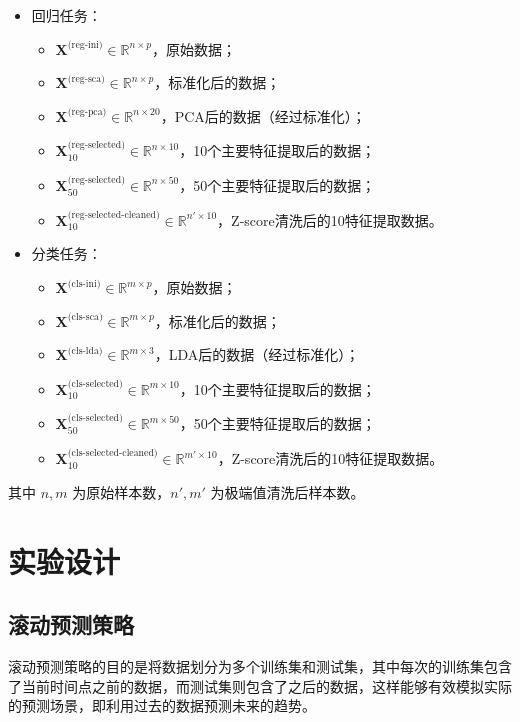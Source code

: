 \documentclass[10pt]{article}
\begin{document}
\begin{itemize}
  \item 回归任务：
    \begin{itemize}
      \item $\mathbf{X}^{\text{(reg-ini)}} \in \mathbb{R}^{n \times p}$，原始数据；
      \item $\mathbf{X}^{\text{(reg-sca)}} \in \mathbb{R}^{n \times p}$，标准化后的数据；
      \item $\mathbf{X}^{\text{(reg-pca)}} \in \mathbb{R}^{n \times 20}$，PCA后的数据（经过标准化）；
      \item $\mathbf{X}^{\text{(reg-selected)}}_{10} \in \mathbb{R}^{n \times 10}$，10个主要特征提取后的数据；
      \item $\mathbf{X}^{\text{(reg-selected)}}_{50} \in \mathbb{R}^{n \times 50}$，50个主要特征提取后的数据；
      \item $\mathbf{X}^{\text{(reg-selected-cleaned)}}_{10} \in \mathbb{R}^{n' \times 10}$，Z-score清洗后的10特征提取数据。
    \end{itemize}
  
  \item 分类任务：
    \begin{itemize}
      \item $\mathbf{X}^{\text{(cls-ini)}} \in \mathbb{R}^{m \times p}$，原始数据；
      \item $\mathbf{X}^{\text{(cls-sca)}} \in \mathbb{R}^{m \times p}$，标准化后的数据；
      \item $\mathbf{X}^{\text{(cls-lda)}} \in \mathbb{R}^{m \times 3}$，LDA后的数据（经过标准化）；
      \item $\mathbf{X}^{\text{(cls-selected)}}_{10} \in \mathbb{R}^{m \times 10}$，10个主要特征提取后的数据；
      \item $\mathbf{X}^{\text{(cls-selected)}}_{50} \in \mathbb{R}^{m \times 50}$，50个主要特征提取后的数据；
      \item $\mathbf{X}^{\text{(cls-selected-cleaned)}}_{10} \in \mathbb{R}^{m' \times 10}$，Z-score清洗后的10特征提取数据。
    \end{itemize}
\end{itemize}

其中 $n,m$ 为原始样本数，$n',m'$ 为极端值清洗后样本数。
\section{实验设计}
\subsection{滚动预测策略}
滚动预测策略的目的是将数据划分为多个训练集和测试集，其中每次的训练集包含了当前时间点之前的数据，而测试集则包含了之后的数据，这样能够有效模拟实际的预测场景，即利用过去的数据预测未来的趋势。
\end{document}
